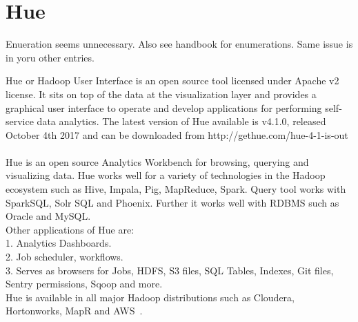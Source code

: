 \section{Hue}

\begin{NOTE}
Enueration seems unnecessary. Also see handbook for enumerations. Same
issue is in yoru other entries.
\end{NOTE}

Hue or Hadoop User Interface is an open source tool licensed 
under Apache v2 license. It sits on top of the data at the 
visualization layer and provides a graphical user interface to 
operate and develop applications for performing self-service 
data analytics.
The latest version of Hue available is v4.1.0, released October 
4th 2017 and can be downloaded from http://gethue.com/hue-4-1-is-out
~\cite{hid-sp18-517-hue-apache} \\

Hue is an open source Analytics Workbench for browsing, querying 
and visualizing data.
Hue works well for a variety of technologies in the Hadoop 
ecosystem such as Hive, Impala, Pig, MapReduce, Spark. Query 
tool works with SparkSQL, Solr SQL and Phoenix. Further it works 
well with RDBMS such as Oracle and MySQL. \\

Other applications of Hue are: \\

1. Analytics Dashboards. \\
2. Job scheduler, workflows. \\
3. Serves as browsers for Jobs, HDFS, S3 files, SQL Tables, Indexes, 
Git files, Sentry permissions, Sqoop and more. \\

Hue is available in all major Hadoop distributions such as Cloudera, 
Hortonworks, MapR and AWS~\cite{hid-sp18-517-Hue-wiki}.

